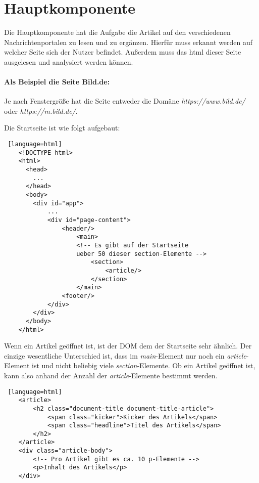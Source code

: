 \section{Hauptkomponente} \label{sec:06:hauptkomponente}

Die Hauptkomponente hat die Aufgabe die Artikel auf den verschiedenen Nachrichtenportalen zu lesen und zu ergänzen.
Hierfür muss erkannt werden auf welcher Seite sich der Nutzer befindet. Außerdem muss das html dieser Seite ausgelesen und analysiert werden können.

\paragraph{Als Beispiel die Seite Bild.de:} 
Je nach Fenstergröße hat die Seite entweder die Domäne \textit{https://www.bild.de/} oder \textit{https://m.bild.de/}.

Die Startseite ist wie folgt aufgebaut:

\begin{lstlisting} [language=html]
    <!DOCTYPE html>
    <html>
      <head>
        ...
      </head>
      <body>
        <div id="app">
            ...
            <div id="page-content">
                <header/>
                    <main>
                    <!-- Es gibt auf der Startseite 
                    ueber 50 dieser section-Elemente -->
                        <section>
                            <article/>
                        </section>
                    </main>
                <footer/>
            </div>    
        </div>
      </body>
    </html>
\end{lstlisting}

Wenn ein Artikel geöffnet ist, ist der DOM dem der Startseite sehr ähnlich. Der einzige wesentliche Unterschied ist, dass im \textit{main}-Element
nur noch ein \textit{article}-Element ist und nicht beliebig viele \textit{section}-Elemente.
Ob ein Artikel geöffnet ist, kann also anhand der Anzahl der \textit{article}-Elemente bestimmt werden.

\begin{lstlisting} [language=html]
    <article>
        <h2 class="document-title document-title-article">
            <span class="kicker">Kicker des Artikels</span>
            <span class="headline">Titel des Artikels</span>
        </h2>
    </article>
    <div class="article-body">
        <!-- Pro Artikel gibt es ca. 10 p-Elemente -->
        <p>Inhalt des Artikels</p>
    </div>
\end{lstlisting}

